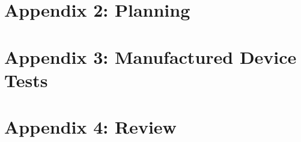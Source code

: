 \documentclass{article}
\begin{document}
\section{Appendix 2: Planning}

\pagebreak

\section{Appendix 3: Manufactured Device Tests}


\section{Appendix 4: Review}
\end{document}
